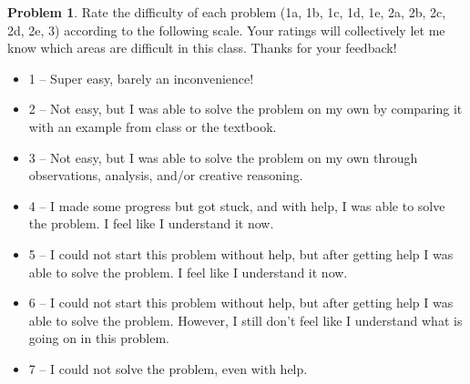 \documentclass[11pt,oneside]{amsart}
\theoremstyle{definition}
\newtheorem{problem}{Problem}
\theoremstyle{plain}
\begin{document}
\begin{problem}
Rate the difficulty of each problem (1a, 1b, 1c, 1d, 1e, 2a, 2b, 2c, 2d, 2e, 3) according to the following scale. Your ratings will collectively let me know which areas are difficult in this class. Thanks for your feedback!
\begin{itemize}
  \item 1 -- Super easy, barely an inconvenience!
  \item 2 -- Not easy, but I was able to solve the problem on my own by comparing it with an example from class or the textbook.
  \item 3 -- Not easy, but I was able to solve the problem on my own through observations, analysis, and/or creative reasoning.
  \item 4 -- I made some progress but got stuck, and with help, I was able to solve the problem. I feel like I understand it now.
  \item 5 -- I could not start this problem without help, but after getting help I was able to solve the problem. I feel like I understand it now.
  \item 6 -- I could not start this problem without help, but after getting help I was able to solve the problem. However, I still don't feel like I understand what is going on in this problem.
  \item 7 -- I could not solve the problem, even with help.
\end{itemize}
\end{problem}
\end{document}
